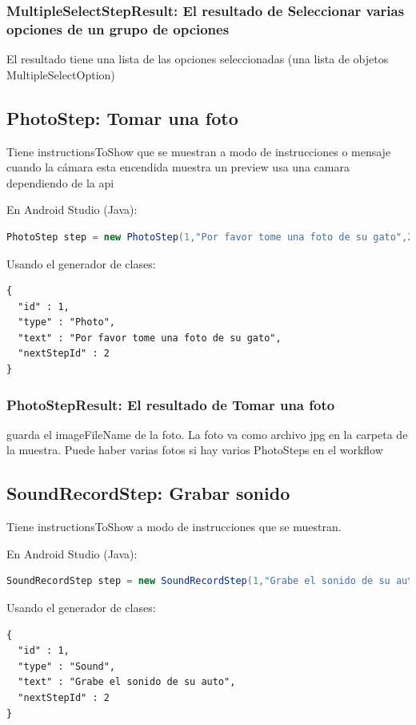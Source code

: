 \subsubsection{MultipleSelectStepResult: El resultado de Seleccionar varias opciones de un grupo de opciones}
El resultado tiene una lista de las opciones seleccionadas (una lista de objetos MultipleSelectOption)

\subsection{PhotoStep: Tomar una foto}
Tiene instructionsToShow que se muestran a modo de instrucciones o mensaje cuando la cámara esta encendida
muestra un preview
usa una camara dependiendo de la api

En Android Studio (Java):
\begin{lstlisting}[language=Java, frame=tlb]	
PhotoStep step = new PhotoStep(1,"Por favor tome una foto de su gato",2);
\end{lstlisting}

Usando el generador de clases:
\begin{lstlisting}[language=XML, frame=tlb]	
{
  "id" : 1,
  "type" : "Photo",
  "text" : "Por favor tome una foto de su gato",
  "nextStepId" : 2
}
\end{lstlisting}

\subsubsection{PhotoStepResult: El resultado de Tomar una foto}
guarda el imageFileName de la foto. 
La foto va como archivo jpg en la carpeta de la muestra.
Puede haber varias fotos si hay varios PhotoSteps en el workflow

\subsection{SoundRecordStep: Grabar sonido}
Tiene instructionsToShow a modo de instrucciones que se muestran.

En Android Studio (Java):
\begin{lstlisting}[language=Java, frame=tlb]	
SoundRecordStep step = new SoundRecordStep(1,"Grabe el sonido de su auto",2); 
\end{lstlisting}

Usando el generador de clases:
\begin{lstlisting}[language=XML, frame=tlb]	
{
  "id" : 1,
  "type" : "Sound",
  "text" : "Grabe el sonido de su auto",
  "nextStepId" : 2
}
\end{lstlisting}

